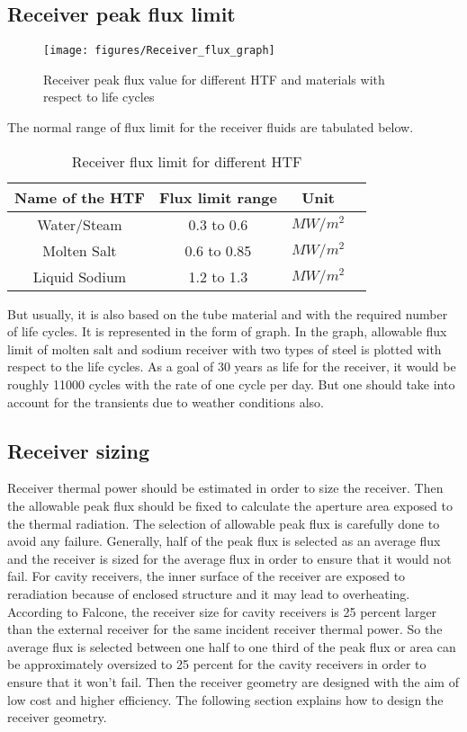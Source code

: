 \subsection{Receiver peak flux limit }
\begin{figure}[h]
	\texttt{[image: figures/Receiver\_flux\_graph]}
	\centering
	\caption{Receiver peak flux value for different HTF and materials with respect to life cycles}
\end{figure}
The normal range of flux limit for the receiver fluids are tabulated below.
\begin{table}[h]
\begin{center}
	\begin{tabular}{ |c|c|c|c| } 
		\hline
		 \textbf{Name of the HTF} & \textbf{Flux limit range} & \textbf{Unit} \\
		\hline
		Water/Steam & 0.3 to 0.6 & $ MW/m^2 $ \\ 
		\hline
		Molten Salt& 0.6 to 0.85 & $ MW/m^2 $ \\ 
		\hline
		Liquid Sodium& 1.2 to 1.3 & $ MW/m^2 $ \\ 
		\hline
	\end{tabular}
	\caption{Receiver flux limit for different HTF\label{Receiver_flux_limit}}
\end{center}
\end{table}
But usually, it is also based on the tube material and with the required number of life cycles. It is represented in the form of graph. In the graph, allowable flux limit of molten salt and sodium receiver with two types of steel is plotted with respect to the life cycles. As a goal of 30 years as life for the receiver, it would be roughly 11000 cycles with the rate of one cycle per day. But one should take into account for the transients due to weather conditions also.
\subsection{Receiver sizing}
Receiver thermal power should be estimated in order to size the receiver. Then the allowable peak flux should be fixed to calculate the aperture area exposed to the thermal radiation. The selection of allowable peak flux is carefully done to avoid any failure. Generally, half of the peak flux is selected as an average flux and the receiver is sized for the average flux in order to ensure that it would not fail. For cavity receivers, the inner surface of the receiver are exposed to reradiation because of enclosed structure and it may lead to overheating. According to Falcone, the receiver size for cavity receivers is 25 percent larger than the external receiver for the same incident receiver thermal power. So the average flux is selected between one half to one third of the peak flux or area can be approximately oversized to 25 percent for the cavity receivers in order to ensure that it won't fail.  Then the receiver geometry are designed with the aim of low cost and higher efficiency. The following section explains how to design the receiver geometry.
